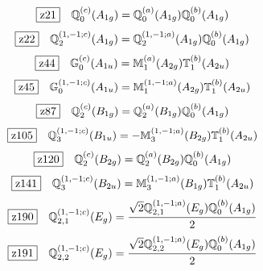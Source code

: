 \documentclass[fleqn,10pt,landscape]{jsarticle}
\begin{document}
\begin{dmath*}
\hspace*{3mm}\fbox{z21}\quad \mathbb{Q}_{0}^{(c)}(A_{1g})=\mathbb{Q}_{0}^{(a)}(A_{1g}) \mathbb{Q}_{0}^{(b)}(A_{1g})
\end{dmath*}
\begin{dmath*}
\hspace*{3mm}\fbox{z22}\quad \mathbb{Q}_{2}^{(1,-1;c)}(A_{1g})=\mathbb{Q}_{2}^{(1,-1;a)}(A_{1g}) \mathbb{Q}_{0}^{(b)}(A_{1g})
\end{dmath*}
\begin{dmath*}
\hspace*{3mm}\fbox{z44}\quad \mathbb{G}_{0}^{(c)}(A_{1u})=\mathbb{M}_{1}^{(a)}(A_{2g}) \mathbb{T}_{1}^{(b)}(A_{2u})
\end{dmath*}
\begin{dmath*}
\hspace*{3mm}\fbox{z45}\quad \mathbb{G}_{0}^{(1,-1;c)}(A_{1u})=\mathbb{M}_{1}^{(1,-1;a)}(A_{2g}) \mathbb{T}_{1}^{(b)}(A_{2u})
\end{dmath*}
\begin{dmath*}
\hspace*{3mm}\fbox{z87}\quad \mathbb{Q}_{2}^{(c)}(B_{1g})=\mathbb{Q}_{2}^{(a)}(B_{1g}) \mathbb{Q}_{0}^{(b)}(A_{1g})
\end{dmath*}
\begin{dmath*}
\hspace*{3mm}\fbox{z105}\quad \mathbb{Q}_{3}^{(1,-1;c)}(B_{1u})=- \mathbb{M}_{3}^{(1,-1;a)}(B_{2g}) \mathbb{T}_{1}^{(b)}(A_{2u})
\end{dmath*}
\begin{dmath*}
\hspace*{3mm}\fbox{z120}\quad \mathbb{Q}_{2}^{(c)}(B_{2g})=\mathbb{Q}_{2}^{(a)}(B_{2g}) \mathbb{Q}_{0}^{(b)}(A_{1g})
\end{dmath*}
\begin{dmath*}
\hspace*{3mm}\fbox{z141}\quad \mathbb{Q}_{3}^{(1,-1;c)}(B_{2u})=\mathbb{M}_{3}^{(1,-1;a)}(B_{1g}) \mathbb{T}_{1}^{(b)}(A_{2u})
\end{dmath*}
\begin{dmath*}
\hspace*{3mm}\fbox{z190}\quad \mathbb{Q}_{2,1}^{(1,-1;c)}(E_{g})=\frac{\sqrt{2} \mathbb{Q}_{2,1}^{(1,-1;a)}(E_{g}) \mathbb{Q}_{0}^{(b)}(A_{1g})}{2}
\end{dmath*}
\begin{dmath*}
\hspace*{3mm}\fbox{z191}\quad \mathbb{Q}_{2,2}^{(1,-1;c)}(E_{g})=\frac{\sqrt{2} \mathbb{Q}_{2,2}^{(1,-1;a)}(E_{g}) \mathbb{Q}_{0}^{(b)}(A_{1g})}{2}
\end{dmath*}
\end{document}
